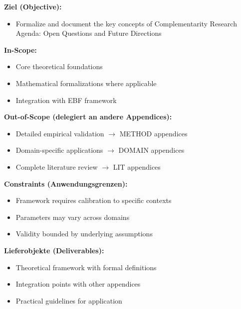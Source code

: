 \begin{tcolorbox}[
    colback=orange!5!white,
    colframe=orange!75!black,
    title={\textbf{Appendix Scope: Ziel / In-Scope / Out-of-Scope / Constraints}},
    fonttitle=\bfseries
]

\textbf{Ziel (Objective):}
\begin{itemize}[nosep]
    \item Formalize and document the key concepts of Complementarity Research Agenda: Open Questions and Future Directions
\end{itemize}

\textbf{In-Scope:}
\begin{itemize}[nosep]
    \item Core theoretical foundations
    \item Mathematical formalizations where applicable
    \item Integration with EBF framework
\end{itemize}

\textbf{Out-of-Scope (delegiert an andere Appendices):}
\begin{itemize}[nosep]
    \item Detailed empirical validation $\rightarrow$ METHOD appendices
    \item Domain-specific applications $\rightarrow$ DOMAIN appendices
    \item Complete literature review $\rightarrow$ LIT appendices
\end{itemize}

\textbf{Constraints (Anwendungsgrenzen):}
\begin{itemize}[nosep]
    \item Framework requires calibration to specific contexts
    \item Parameters may vary across domains
    \item Validity bounded by underlying assumptions
\end{itemize}

\textbf{Lieferobjekte (Deliverables):}
\begin{itemize}[nosep]
    \item Theoretical framework with formal definitions
    \item Integration points with other appendices
    \item Practical guidelines for application
\end{itemize}

\end{tcolorbox}



